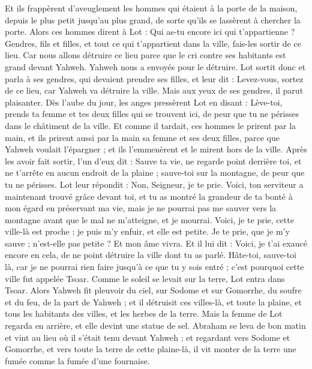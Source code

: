 \begin{multicols}{2}
Et ils frappèrent d'aveuglement les hommes qui étaient à la porte de la maison, depuis le plus petit jusqu'au plus grand, de sorte qu'ils se lassèrent à chercher la porte.
Alors ces hommes dirent à Lot : Qui as-tu encore ici qui t'appartienne ? Gendres, fils et filles, et tout ce qui t'appartient dans la ville, fais-les sortir de ce lieu.
Car nous allons détruire ce lieu parce que le cri contre ses habitants est grand devant Yahweh. Yahweh nous a envoyés pour le détruire.
Lot sortit donc et parla à ses gendres, qui devaient prendre ses filles, et leur dit : Levez-vous, sortez de ce lieu, car Yahweh va détruire la ville. Mais aux yeux de ses gendres, il parut plaisanter.
Dès l'aube du jour, les anges pressèrent Lot en disant : Lève-toi, prends ta femme et tes deux filles qui se trouvent ici, de peur que tu ne périsses dans le châtiment de la ville.
Et comme il tardait, ces hommes le prirent par la main, et ils prirent aussi par la main sa femme et ses deux filles, parce que Yahweh voulait l'épargner ; et ils l'emmenèrent et le mirent hors de la ville.
Après les avoir fait sortir, l'un d'eux dit : Sauve ta vie, ne regarde point derrière toi, et ne t'arrête en aucun endroit de la plaine ; sauve-toi sur la montagne, de peur que tu ne périsses.
Lot leur répondit : Non, Seigneur, je te prie.
Voici, ton serviteur a maintenant trouvé grâce devant toi, et tu as montré la grandeur de ta bonté à mon égard en préservant ma vie, mais je ne pourrai pas me sauver vers la montagne avant que le mal ne m'atteigne, et je mourrai.
Voici, je te prie, cette ville-là est proche ; je puis m'y enfuir, et elle est petite. Je te prie, que je m'y sauve ; n'est-elle pas petite ? Et mon âme vivra.
Et il lui dit : Voici, je t'ai exaucé encore en cela, de ne point détruire la ville dont tu as parlé.
Hâte-toi, sauve-toi là, car je ne pourrai rien faire jusqu'à ce que tu y sois entré ; c'est pourquoi cette ville fut appelée Tsoar.
Comme le soleil se levait sur la terre, Lot entra dans Tsoar.
Alors Yahweh fit pleuvoir du ciel, sur Sodome et sur Gomorrhe, du soufre et du feu, de la part de Yahweh ;
et il détruisit ces villes-là, et toute la plaine, et tous les habitants des villes, et les herbes de la terre.
Mais la femme de Lot regarda en arrière, et elle devint une statue de sel.
Abraham se leva de bon matin et vint au lieu où il s'était tenu devant Yahweh ;
et regardant vers Sodome et Gomorrhe, et vers toute la terre de cette plaine-là, il vit monter de la terre une fumée comme la fumée d'une fournaise.

\end{multicols}

